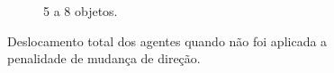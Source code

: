 \begin{figure}[h]
\begin{subfigure}[t]{0.49\textwidth}
    \caption{5 a 8 objetos.}
  \end{subfigure}
  \caption[Deslocamento de um agente utilizando a penalização de mudança de direção]{Deslocamento total dos agentes quando não foi aplicada a penalidade de mudança de direção.}
  \label{fig:ambiente_penalizacao_deslocamento_sem}
\end{figure}

